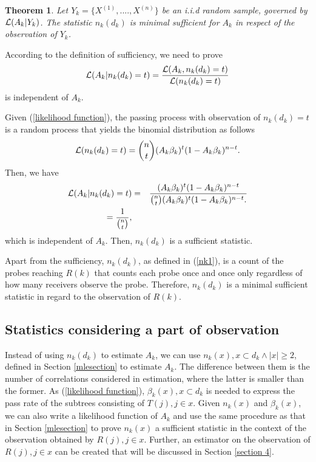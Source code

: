 \documentclass[10pt,onecolumn]{IEEEtran}
\newtheorem{theorem}{\bf Theorem}
\begin{document}
\begin{theorem}\label{complete minimal sufficient statistics}
Let $Y_k=\{X^{(1)},....,X^{(n)}\}$ be an i.i.d random sample, governed by  ${\cal L}(A_k|Y_k)$. The statistic $n_k(d_k)$ is minimal
sufficient for $A_k$ in respect of the observation of $Y_k$.
\end{theorem}

\begin{IEEEproof}
According to the definition of sufficiency, we need to prove
\begin{equation}
{\cal L}(A_k|n_k(d_k)=t)=\dfrac{{\cal L}(A_k, n_k(d_k)=t)}{{\cal L}(n_k(d_k)=t)}
\label{suff-condition}
\end{equation} is independent of $A_k$.

Given (\ref{likelihood function}), the passing process with observation of $n_k(d_k)=t$ is a random process that yields the binomial distribution as follows
\[
{\cal L}(n_k(d_k)=t)=\binom{n}{t}(A_k\beta_k)^{t}(1-A_k\beta_k)^{n-t}.
\]
Then, we have
\begin{eqnarray}
{\cal L}(A_k|n_k(d_k)=t)&=&\dfrac{(A_k\beta_k)^{t}(1-A_k\beta_k)^{n-t}}{\binom{n}{t}(A_k\beta_k)^{t}(1-A_k\beta_k)^{n-t}.
} \nonumber \\
=\dfrac{1}{\binom{n}{t}},
\end{eqnarray}
which is independent of $A_k$. Then, $n_k(d_k)$ is a sufficient statistic.

Apart from the sufficiency,
 $n_k(d_k)$,  as defined in (\ref{nk1}), is a count of the probes reaching $R(k)$ that counts each probe once and once only regardless of how many receivers observe the probe. Therefore,  $n_k(d_k)$ is a minimal sufficient statistic in regard to the observation of $R(k)$.
\end{IEEEproof}

\subsection{Statistics considering a part of observation}
\label{mlestatistics}
Instead of using $n_k(d_k)$ to estimate $A_k$, we can use $n_k(x), x \subset d_k \land |x|\geq 2$, defined in Section \ref{mlesection} to estimate $A_k$. The difference between them is the number of correlations considered in estimation, where the latter  is smaller than the former. As (\ref{likelihood function}), $\beta_k(x), x \subset d_k$ is needed to express the pass rate of the subtrees consisting of $T(j), j \in x$. Given $n_k(x)$ and $\beta_k(x)$, we can also write a likelihood function of $A_k$ and use the same procedure as that in Section \ref{mlesection} to prove $n_k(x)$ a sufficient statistic in the context of the observation obtained by $R(j), j \in x$. Further, an estimator on the observation of $R(j), j \in x$ can be created that will be discussed in Section \ref{section 4}.
\end{document}
